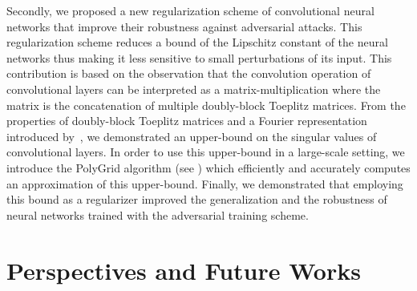 Secondly, we proposed a new regularization scheme of convolutional neural networks that improve their robustness against adversarial attacks.
This regularization scheme reduces a bound of the Lipschitz constant of the neural networks thus making it less sensitive to small perturbations of its input.
This contribution is based on the observation that the convolution operation of convolutional layers can be interpreted as a matrix-multiplication where the matrix is the concatenation of multiple doubly-block Toeplitz matrices.
From the properties of doubly-block Toeplitz matrices and a Fourier representation introduced by~\citet{grenander1958toeplitz}, we demonstrated an upper-bound on the singular values of convolutional layers.
In order to use this upper-bound in a large-scale setting, we introduce the PolyGrid algorithm (see ) which efficiently and accurately computes an approximation of this upper-bound.
Finally, we demonstrated that employing this bound as a regularizer improved the generalization and the robustness of neural networks trained with the adversarial training scheme.


\section{Perspectives and Future Works}
\label{section:ch6-perspectives_and_future_works}

